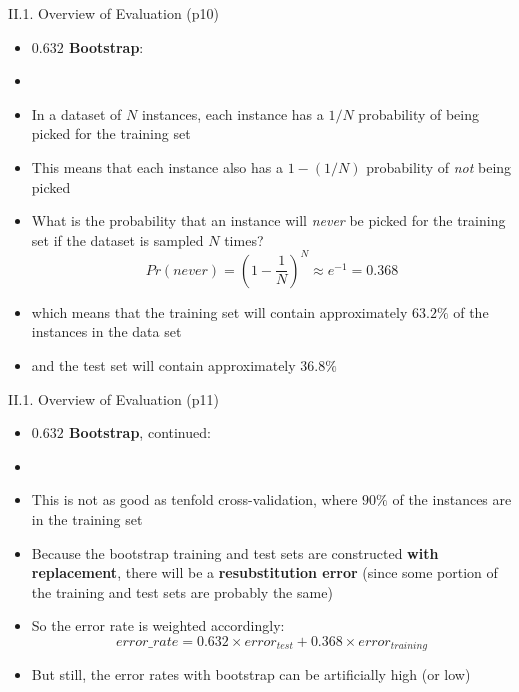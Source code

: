 \documentclass[handout]{beamer}
\newcommand{\strong}[1]{\textbf{\color{teal} #1}}
\newcommand{\stronger}[1]{\textbf{\color{purple} #1}}
\begin{document}
\begin{frame}{II.1. Overview of Evaluation (p10)}
\begin{itemize}
\item \stronger{$0.632$ Bootstrap}:
\item[]
\item In a dataset of $N$ instances, each instance has a $1/N$ probability of being picked for the training set
\item This means that each instance also has a $1-(1/N)$ probability of \emph{not} being picked
\item What is the probability that an instance will \emph{never} be picked for the training set if the dataset is sampled $N$ times?
\[
Pr( never ) = ( 1 - \frac{1}{N} )^N \approx e^{-1} = 0.368
\]
\item[] which means that the training set will contain approximately $63.2\%$ of the instances in the data set
\item[] and the test set will contain approximately $36.8\%$
\end{itemize}
\end{frame}
\begin{frame}{II.1. Overview of Evaluation (p11)}
\begin{itemize}
\item \stronger{$0.632$ Bootstrap}, continued:
\item[]
\item This is not as good as tenfold cross-validation, where $90\%$ of the instances are in the training set
\item Because the bootstrap training and test sets are constructed \strong{with replacement}, there will be a \strong{resubstitution error} (since some portion of the training and test sets are probably the same)
\item So the error rate is weighted accordingly:
\[
error\_rate = 0.632 \times error_{test} + 0.368 \times error_{training}
\]
\item But still, the error rates with bootstrap can be artificially high (or low)
\end{itemize}
\end{frame}
\end{document}
